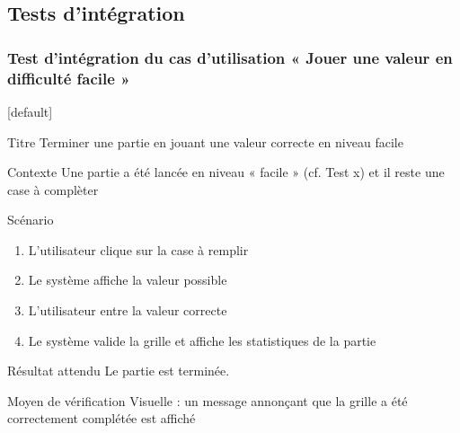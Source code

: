 \documentclass{beamer}
\begin{document}
\subsection{Tests d’intégration}
\begin{frame}
  \frametitle{Test d’intégration  du cas d'utilisation « Jouer une valeur en difficulté facile »}
  [default]
  \begin{block}{\footnotesize{Titre}}
    \scriptsize{Terminer une partie en jouant une valeur correcte en niveau facile}
  \end{block}
  \pause
  \begin{block}{\footnotesize{Contexte}}
    \scriptsize{Une partie a été lancée en niveau « facile » (cf. Test \no x) et il reste une case à complèter}
  \end{block}
  \begin{block}{\footnotesize{Scénario}}
    \begin{enumerate}
      [circle]
      \item
        \scriptsize{L’utilisateur clique sur la case à remplir}
      \item
        \scriptsize{Le système affiche la valeur possible}
      \item
        \scriptsize{L’utilisateur entre la valeur correcte}
      \item
        \scriptsize{Le système valide la grille et affiche les statistiques de la partie}
    \end{enumerate}
  \end{block}
  \pause
  \begin{block}{\footnotesize{Résultat attendu}}
    \scriptsize{Le partie est terminée.}
  \end{block}
  \begin{block}{\footnotesize{Moyen de vérification}}
    \scriptsize{Visuelle : un message annonçant que la grille a été correctement complétée est affiché}
  \end{block}
\end{frame}
\end{document}
